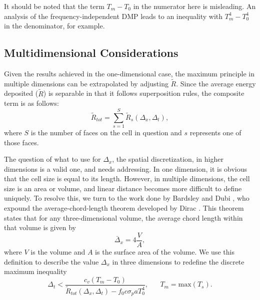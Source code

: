 It should be noted that the term $T_m-T_0$ in the numerator here is misleading. 
An analysis of the frequency-independent DMP leads to an inequality with
$T_m^4-T_0^4$ in the denominator, for example.

\subsection{Multidimensional Considerations}
Given the results achieved in the one-dimensional case, the maximum principle in
multiple dimensions can be extrapolated by adjusting
$\tilde R$.  Since the average energy deposited ($\tilde R$) is
separable in that it follows superposition rules, the composite term is as
follows:
\begin{equation}
\tilde R_{tot} = \sum_{s=1}^S \tilde R_s(\Delta_x,\Delta_t),
\end{equation}
where $S$ is the number of faces on the cell in question and $s$ represents one
of those faces.

The question of what to use for $\Delta_x$, the spatial discretization, in
higher dimensions is a valid one, and needs addressing.  In one dimension, it is
obvious that the cell size is equal to its length. However, in multiple
dimensions, the cell size is an area or volume, and linear distance
becomes more difficult to define uniquely.  To resolve this, we turn to the work
done by Bardsley and Dubi \cite{BardDub}, who expound the average-chord-length
theorem developed by Dirac \cite{Dirac}. This theorem states that for any
three-dimensional volume, the average chord length within that volume is given
by
\begin{equation}
\bar\Delta_x = 4\frac{V}{A},
\end{equation}
where $V$ is the volume and $A$ is the surface area of the volume.  We use this
definition to describe the value $\Delta_x$ in three dimensions to redefine the
discrete maximum inequality
\begin{equation}
\Delta_t<\frac{c_v(T_m-T_0)}{\tilde R_{tot}(\Delta_x,\Delta_t)-
  f_0c\sigma_paT_0^4},  \hspace{20pt} T_m=\mbox{max}(T_s).\label{FINAL dmp}
\end{equation}
